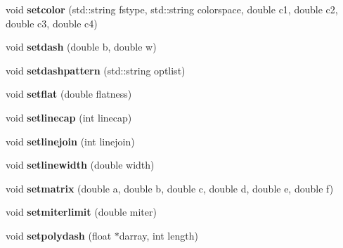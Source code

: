 \begin{DoxyCompactItemize}
\item 
\hypertarget{classPDFlib_a45fca2a5dce286baa78e2394d83baa6f}{void {\bfseries setcolor} (std\-::string fstype, std\-::string colorspace, double c1, double c2, double c3, double c4)}\label{classPDFlib_a45fca2a5dce286baa78e2394d83baa6f}

\item 
\hypertarget{classPDFlib_a45e9138f953e972ab2f09f076d105c7b}{void {\bfseries setdash} (double b, double w)}\label{classPDFlib_a45e9138f953e972ab2f09f076d105c7b}

\item 
\hypertarget{classPDFlib_a54c49fec034612feaf38fad5df9f76b7}{void {\bfseries setdashpattern} (std\-::string optlist)}\label{classPDFlib_a54c49fec034612feaf38fad5df9f76b7}

\item 
\hypertarget{classPDFlib_a305e47f39351bc587c78c90cc4edabba}{void {\bfseries setflat} (double flatness)}\label{classPDFlib_a305e47f39351bc587c78c90cc4edabba}

\item 
\hypertarget{classPDFlib_a60623dfccc99a7fd09b12c9b585092db}{void {\bfseries setlinecap} (int linecap)}\label{classPDFlib_a60623dfccc99a7fd09b12c9b585092db}

\item 
\hypertarget{classPDFlib_a2940808d00b87a16074c03a074057a17}{void {\bfseries setlinejoin} (int linejoin)}\label{classPDFlib_a2940808d00b87a16074c03a074057a17}

\item 
\hypertarget{classPDFlib_a383b08525b4c2acb9700e4e6e964a80a}{void {\bfseries setlinewidth} (double width)}\label{classPDFlib_a383b08525b4c2acb9700e4e6e964a80a}

\item 
\hypertarget{classPDFlib_a3a8cc387192e3a2d0eceb04b004328f0}{void {\bfseries setmatrix} (double a, double b, double c, double d, double e, double f)}\label{classPDFlib_a3a8cc387192e3a2d0eceb04b004328f0}

\item 
\hypertarget{classPDFlib_a63946229c4ae1512d5533459192b9198}{void {\bfseries setmiterlimit} (double miter)}\label{classPDFlib_a63946229c4ae1512d5533459192b9198}

\item 
\hypertarget{classPDFlib_ac49a72864c82f10043e66ba6c1b5a0fb}{void {\bfseries setpolydash} (float $\ast$darray, int length)}\label{classPDFlib_ac49a72864c82f10043e66ba6c1b5a0fb}


\end{DoxyCompactItemize}
